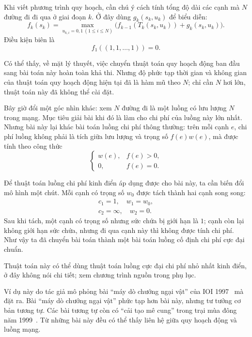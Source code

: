 \documentclass[11pt]{article}
\begin{document}
Khi viết phương trình quy hoạch, cần chú ý cách tính tổng độ dài các cạnh mà
\(N\) đường đi đi qua ở giai đoạn \(k\). Ở đây dùng \(g_k(s_k,u_k)\) để biểu
diễn:
\[
  f_k(s_k)=
  \max_{u_{k,i}=0,1\ (1\le i\le N)}
  \bigl(f_{k-1}(T_k(s_k,u_k))+g_k(s_k,u_k)\bigr).
\]
Điều kiện biên là
\[
  f_1((1,1,\ldots,1))=0.
\]

Có thể thấy, về mặt lý thuyết, việc chuyển thuật toán quy hoạch động ban đầu
sang bài toán này hoàn toàn khả thi. Nhưng độ phức tạp thời gian và không
gian của thuật toán quy hoạch động hiện tại đã là hàm mũ theo \(N\); chỉ cần
\(N\) hơi lớn, thuật toán này đã không thể cài đặt.

Bây giờ đổi một góc nhìn khác: xem \(N\) đường đi là một luồng có lưu lượng
\(N\) trong mạng. Mục tiêu giải bài khi đó là làm cho chi phí của luồng này
lớn nhất. Nhưng bài này lại khác bài toán luồng chi phí thông thường: trên
mỗi cạnh \(e\), chi phí luồng không phải là tích giữa lưu lượng và trọng số
\(f(e)w(e)\), mà được tính theo công thức
\[
\begin{cases}
w(e), & f(e)>0,\\
0, & f(e)=0.
\end{cases}
\]

Để thuật toán luồng chi phí kinh điển áp dụng được cho bài này, ta cần biến
đổi mô hình một chút. Mỗi cạnh có trọng số \(w_0\) được tách thành hai cạnh
song song:
\[
\begin{array}{c}
c_1=1,\quad w_1=w_0,\\
c_2=\infty,\quad w_2=0.
\end{array}
\]
Sau khi tách, một cạnh có trọng số nhưng sức chứa bị giới hạn là \(1\); cạnh
còn lại không giới hạn sức chứa, nhưng đi qua cạnh này thì không được tính
chi phí. Như vậy ta đã chuyển bài toán thành một bài toán luồng cố định chi
phí cực đại chuẩn.

Thuật toán này có thể dùng thuật toán luồng cực đại chi phí nhỏ nhất kinh
điển, ở đây không nói chi tiết; xem chương trình nguồn trong phụ lục.

Ví dụ này do tác giả mô phỏng bài ``máy dò chướng ngại vật'' của IOI
1997~\cite{detector-statement} mà đặt ra. Bài ``máy dò chướng ngại vật''
phức tạp hơn bài này, nhưng tư tưởng cơ bản tương tự. Các bài tương tự còn có
``cải tạo mê cung'' trong trại mùa đông năm 1999~\cite{maze}. Từ những bài
này đều có thể thấy liên hệ giữa quy hoạch động và luồng mạng.
\end{document}
